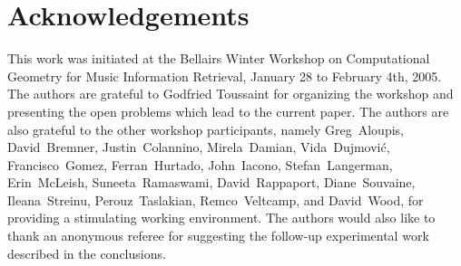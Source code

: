 \documentclass{elsart}
\begin{document}
\section*{Acknowledgements}

This work was initiated at the Bellairs Winter Workshop on
Computational Geometry for Music Information Retrieval, January 28 to
February 4th, 2005.  The authors are grateful to Godfried Toussaint
for organizing the workshop and presenting the open problems which
lead to the current paper.  The authors are also grateful to the other
workshop participants, namely 
Greg~Aloupis,
David~Bremner,
Justin~Colannino,
Mirela~Damian, 
Vida~Dujmovi\'c,
Francisco~Gomez,
Ferran~Hurtado, 
John~Iacono,
Stefan~Langerman,
Erin~McLeish,
Suneeta~Ramaswami,
David~Rappaport,
Diane~Souvaine,
Ileana~Streinu,
Perouz~Taslakian,
Remco~Veltcamp,
and David~Wood,
for providing a
stimulating working environment.  The authors would also like to thank
an anonymous referee for suggesting the follow-up experimental work
described in the conclusions.



\end{document}
